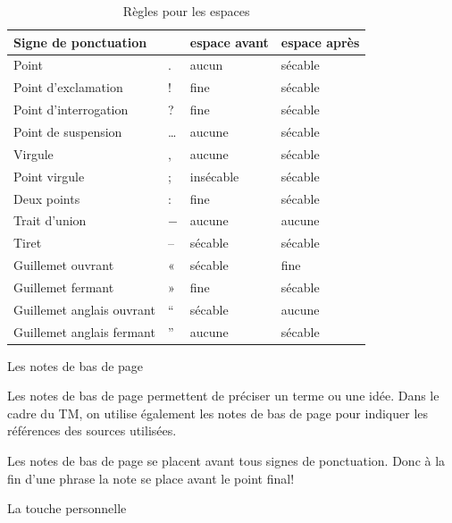 \documentclass[
  a4paper,
]{book}
\makeatletter
\renewcommand{\section}{\@startsection{section}{1}{\z@}
{-4ex \@plus -1ex \@minus -.4ex}
{1ex \@plus.2ex }
{\normalfont\large\sffamily\bfseries}}
\renewcommand{\subsection}{\@startsection {subsection}{2}{\z@}
{-3ex \@plus -0.1ex \@minus -.4ex}
{0.5ex \@plus.2ex }
{\normalfont\sffamily\bfseries}}
\newlength\esp
\makeatother
\begin{document}
\hypertarget{tbl-punctuation}{}
\begin{table}
\caption{\label{tbl-punctuation}Règles pour les espaces }\tabularnewline

\centering
\begin{tabular}[t]{llll}
\toprule
Signe de ponctuation &   & espace avant & espace après\\
\midrule
Point & . & aucun & sécable\\
Point d'exclamation & ! & fine & sécable\\
Point d'interrogation & ? & fine & sécable\\
Point de suspension & … & aucune & sécable\\
\midrule
Virgule & , & aucune & sécable\\
Point virgule & ; & insécable & sécable\\
Deux points & : & fine & sécable\\
\midrule
Trait d'union & − & aucune & aucune\\
Tiret & -- & sécable & sécable\\
\midrule
Guillemet ouvrant & « & sécable & fine\\
Guillemet fermant & » & fine & sécable\\
Guillemet anglais ouvrant & “ & sécable & aucune\\
Guillemet anglais fermant & ” & aucune & sécable\\
\bottomrule
\end{tabular}
\end{table}

\hypertarget{les-notes-de-bas-de-page}{%
\subsection{Les notes de bas de page}\label{les-notes-de-bas-de-page}}

Les notes de bas de page permettent de préciser un terme ou une idée.
Dans le cadre du TM, on utilise également les notes de bas de page pour
indiquer les références des sources utilisées.

Les notes de bas de page se placent avant tous signes de ponctuation.
Donc à la fin d'une phrase la note se place avant le point final!

\hypertarget{la-touche-personnelle}{%
\section{La touche personnelle}\label{la-touche-personnelle}}
\end{document}
